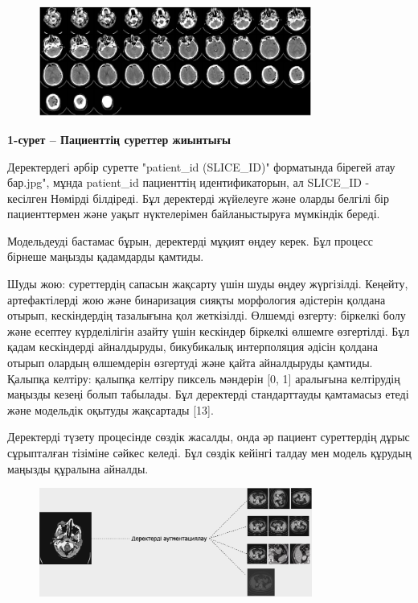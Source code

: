 \begin{figure}[H]
	\centering
	\includegraphics[width=0.8\textwidth]{assets/1}
	\caption*{}
\end{figure}

\textbf{1-сурет -- Пациенттің суреттер жиынтығы}

Деректердегі әрбір суретте "patient\_id (SLICE\_ID)" форматында бірегей
атау бар.jpg", мұнда patient\_id пациенттің идентификаторын, ал
SLICE\_ID - кесілген Нөмірді білдіреді. Бұл деректерді жүйелеуге және
оларды белгілі бір пациенттермен және уақыт нүктелерімен байланыстыруға
мүмкіндік береді.

Модельдеуді бастамас бұрын, деректерді мұқият өңдеу керек. Бұл процесс
бірнеше маңызды қадамдарды қамтиды.

Шуды жою: суреттердің сапасын жақсарту үшін шуды өңдеу жүргізілді.
Кеңейту, артефактілерді жою және бинаризация сияқты морфология әдістерін
қолдана отырып, кескіндердің тазалығына қол жеткізілді. Өлшемді өзгерту:
біркелкі болу және есептеу күрделілігін азайту үшін кескіндер біркелкі
өлшемге өзгертілді. Бұл қадам кескіндерді айналдыруды, бикубикалық
интерполяция әдісін қолдана отырып олардың өлшемдерін өзгертуді және
қайта айналдыруды қамтиды. Қалыпқа келтіру: қалыпқа келтіру пиксель
мәндерін {[}0, 1{]} аралығына келтірудің маңызды кезеңі болып табылады.
Бұл деректерді стандарттауды қамтамасыз етеді және модельдік оқытуды
жақсартады {[}13{]}.

Деректерді түзету процесінде сөздік жасалды, онда әр пациент суреттердің
дұрыс сұрыпталған тізіміне сәйкес келеді. Бұл сөздік кейінгі талдау мен
модель құрудың маңызды құралына айналды.

\begin{figure}[H]
	\centering
	\includegraphics[width=0.8\textwidth]{assets/2}
	\caption*{}
\end{figure}

